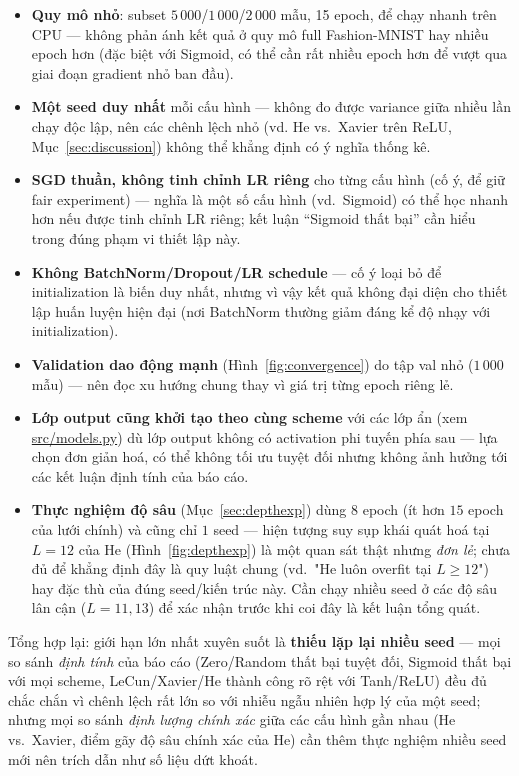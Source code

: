 \documentclass[12pt,a4paper]{article}
\begin{document}
\begin{itemize}
\item \textbf{Quy mô nhỏ}: subset $5\,000$/$1\,000$/$2\,000$ mẫu, 15
  epoch, để chạy nhanh trên CPU --- không phản ánh kết quả ở quy mô full
  Fashion-MNIST hay nhiều epoch hơn (đặc biệt với Sigmoid, có thể cần rất
  nhiều epoch hơn để vượt qua giai đoạn gradient nhỏ ban đầu).
\item \textbf{Một seed duy nhất} mỗi cấu hình --- không đo được
  variance giữa nhiều lần chạy độc lập, nên các chênh lệch nhỏ (vd. He vs.\
  Xavier trên ReLU, Mục~\ref{sec:discussion}) không thể khẳng định có ý
  nghĩa thống kê.
\item \textbf{SGD thuần, không tinh chỉnh LR riêng} cho từng cấu hình
  (cố ý, để giữ fair experiment) --- nghĩa là một số cấu hình (vd.\
  Sigmoid) có thể học nhanh hơn nếu được tinh chỉnh LR riêng; kết luận
  ``Sigmoid thất bại'' cần hiểu trong đúng phạm vi thiết lập này.
\item \textbf{Không BatchNorm/Dropout/LR schedule} --- cố ý loại bỏ để
  initialization là biến duy nhất, nhưng vì vậy kết quả không đại diện cho
  thiết lập huấn luyện hiện đại (nơi BatchNorm thường giảm đáng kể độ nhạy
  với initialization).
\item \textbf{Validation dao động mạnh} (Hình~\ref{fig:convergence}) do
  tập val nhỏ ($1\,000$ mẫu) --- nên đọc xu hướng chung thay vì giá trị
  từng epoch riêng lẻ.
\item \textbf{Lớp output cũng khởi tạo theo cùng scheme} với các lớp ẩn
  (xem \url{src/models.py}) dù lớp output không có activation phi tuyến
  phía sau --- lựa chọn đơn giản hoá, có thể không tối ưu tuyệt đối nhưng
  không ảnh hưởng tới các kết luận định tính của báo cáo.
\item \textbf{Thực nghiệm độ sâu} (Mục~\ref{sec:depthexp}) dùng $8$ epoch
  (ít hơn $15$ epoch của lưới chính) và cũng chỉ $1$ seed --- hiện tượng
  suy sụp khái quát hoá tại $L{=}12$ của He (Hình~\ref{fig:depthexp}) là
  một quan sát thật nhưng \emph{đơn lẻ}; chưa đủ để khẳng định đây là quy
  luật chung (vd.\ "He luôn overfit tại $L\ge12$") hay đặc thù của đúng
  seed/kiến trúc này. Cần chạy nhiều seed ở các độ sâu lân cận
  ($L{=}11,13$) để xác nhận trước khi coi đây là kết luận tổng quát.
\end{itemize}

Tổng hợp lại: giới hạn lớn nhất xuyên suốt là \textbf{thiếu lặp lại nhiều
seed} --- mọi so sánh \emph{định tính} của báo cáo (Zero/Random thất bại
tuyệt đối, Sigmoid thất bại với mọi scheme, LeCun/Xavier/He thành công rõ
rệt với Tanh/ReLU) đều đủ chắc chắn vì chênh lệch rất lớn so với nhiễu
ngẫu nhiên hợp lý của một seed; nhưng mọi so sánh \emph{định lượng chính
xác} giữa các cấu hình gần nhau (He vs.\ Xavier, điểm gãy độ sâu chính
xác của He) cần thêm thực nghiệm nhiều seed mới nên trích dẫn như số liệu
dứt khoát.
\end{document}
